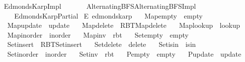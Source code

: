 %
\begin{isabellebody}%
%
%
\isadelimtheory
%
\endisadelimtheory
%
\isatagtheory
{}\isamarkupfalse%
\ Edmonds{\isacharunderscore}{\kern0pt}Karp{\isacharunderscore}{\kern0pt}Impl\isanewline
\ \ \isanewline
\ \ \ \ {\isachardoublequoteopen}{\isachardot}{\kern0pt}{\isachardot}{\kern0pt}{\isacharslash}{\kern0pt}Alternating{\isacharunderscore}{\kern0pt}BFS{\isacharslash}{\kern0pt}Alternating{\isacharunderscore}{\kern0pt}BFS{\isacharunderscore}{\kern0pt}Impl{\isachardoublequoteclose}\isanewline
\ \ \ \ Edmonds{\isacharunderscore}{\kern0pt}Karp{\isacharunderscore}{\kern0pt}Partial\isanewline
{}%
\endisatagtheory
{\isafoldtheory}%
%
\isadelimtheory
\isanewline
%
\endisadelimtheory
\isanewline
{}\isamarkupfalse%
\ E{\isacharcolon}{\kern0pt}\ edmonds{\isacharunderscore}{\kern0pt}karp\ \isanewline
\ \ Map{\isacharunderscore}{\kern0pt}empty\ {\isacharequal}{\kern0pt}\ empty\ \isanewline
\ \ Map{\isacharunderscore}{\kern0pt}update\ {\isacharequal}{\kern0pt}\ update\ \isanewline
\ \ Map{\isacharunderscore}{\kern0pt}delete\ {\isacharequal}{\kern0pt}\ RBT{\isacharunderscore}{\kern0pt}Map{\isachardot}{\kern0pt}delete\ \isanewline
\ \ Map{\isacharunderscore}{\kern0pt}lookup\ {\isacharequal}{\kern0pt}\ lookup\ \isanewline
\ \ Map{\isacharunderscore}{\kern0pt}inorder\ {\isacharequal}{\kern0pt}\ inorder\ \isanewline
\ \ Map{\isacharunderscore}{\kern0pt}inv\ {\isacharequal}{\kern0pt}\ rbt\ \isanewline
\ \ Set{\isacharunderscore}{\kern0pt}empty\ {\isacharequal}{\kern0pt}\ empty\ \isanewline
\ \ Set{\isacharunderscore}{\kern0pt}insert\ {\isacharequal}{\kern0pt}\ RBT{\isacharunderscore}{\kern0pt}Set{\isachardot}{\kern0pt}insert\ \isanewline
\ \ Set{\isacharunderscore}{\kern0pt}delete\ {\isacharequal}{\kern0pt}\ delete\ \isanewline
\ \ Set{\isacharunderscore}{\kern0pt}isin\ {\isacharequal}{\kern0pt}\ isin\ \isanewline
\ \ Set{\isacharunderscore}{\kern0pt}inorder\ {\isacharequal}{\kern0pt}\ inorder\ \isanewline
\ \ Set{\isacharunderscore}{\kern0pt}inv\ {\isacharequal}{\kern0pt}\ rbt\ \isanewline
\ \ P{\isacharunderscore}{\kern0pt}empty\ {\isacharequal}{\kern0pt}\ empty\ \isanewline
\ \ P{\isacharunderscore}{\kern0pt}update\ {\isacharequal}{\kern0pt}\ update\ \isanewline

\end{isabellebody}
